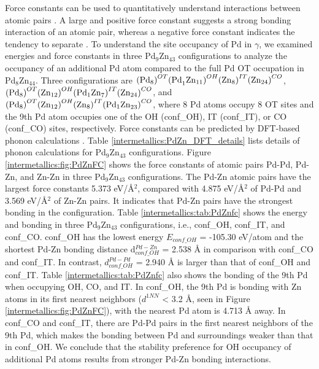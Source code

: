 Force constants can be used to quantitatively understand interactions between atomic pairs \cite{shang2009first}. A large and positive force constant suggests a strong bonding interaction of an atomic pair, whereas a negative force constant indicates the tendency to separate \cite{yu2019synthesis}. To understand the site occupancy of Pd in $\gamma$, we examined energies and force constants in three Pd$_9$Zn$_{43}$ configurations to analyze the occupancy of an additional Pd atom compared to the full Pd OT occupation in Pd$_8$Zn$_{44}$. Three configurations are $({{\rm Pd}_8)}^{OT}{{(\rm Pd}_1{\rm Zn}_{11})}^{OH}({{\rm Zn}_8)}^{IT}({{\rm Zn}_{24})}^{CO}$, \\$({{\rm Pd}_8)}^{OT}{({\rm Zn}_{12})}^{OH}({{{\rm Pd}_1\rm Zn}_7)}^{IT}({{\rm Zn}_{24})}^{CO}$, and $({{\rm Pd}_8)}^{OT}{({\rm Zn}_{12})}^{OH}({{\rm Zn}_8)}^{IT}({{{\rm Pd}_1\rm Zn}_{23})}^{CO}$, where 8 Pd atoms occupy 8 OT sites and the 9th Pd atom occupies one of the OH (conf\_OH), IT (conf\_IT), or CO (conf\_CO) sites, respectively. Force constants can be predicted by DFT-based phonon calculations \cite{shang2018understanding}. Table \ref{intermetallics:PdZn_DFT_details} lists details of phonon calculations for Pd$_9$Zn$_{43}$ configurations. Figure \ref{intermetallics:fig:PdZnFC} shows the force constants of atomic pairs Pd-Pd, Pd-Zn, and Zn-Zn in three Pd$_9$Zn$_{43}$ configurations. The Pd-Zn atomic pairs have the largest force constants 5.373 eV/\r{A}$^2$, compared with 4.875 eV/\r{A}$^2$ of Pd-Pd and 3.569 eV/\r{A}$^2$ of Zn-Zn pairs. It indicates that Pd-Zn pairs have the strongest bonding in the configuration. Table \ref{intermetallics:tab:PdZnfc} shows the energy and bonding in three Pd$_9$Zn$_{43}$ configurations, i.e., conf\_OH, conf\_IT, and conf\_CO. conf\_OH has the lowest energy $E_{conf\_OH}$ = -105.30 eV/atom and the shortest Pd-Zn bonding distance d$_{conf\_OH}^{Pd-Zn}$ = 2.538 \r{A} in comparison with conf\_CO and conf\_IT. In contrast, $d_{conf\_OH}^{Pd-Pd}$ = 2.940 \r{A} is larger than that of conf\_OH and conf\_IT. Table \ref{intermetallics:tab:PdZnfc} also shows the bonding of the 9th Pd when occupying OH, CO, and IT. In conf\_OH, the 9th Pd is bonding with Zn atoms in its first nearest neighbors ($d^{1NN}$ < 3.2 \r{A}, seen in Figure \ref{intermetallics:fig:PdZnFC}), with the nearest Pd atom is 4.713 \r{A} away. In conf\_CO and conf\_IT, there are Pd-Pd pairs in the first nearest neighbors of the 9th Pd, which makes the bonding between Pd and surroundings weaker than that in conf\_OH. We conclude that the stability preference for OH occupancy of additional Pd atoms results from stronger Pd-Zn bonding interactions.

